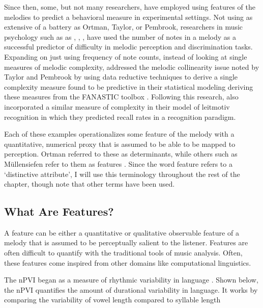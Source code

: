 \documentclass[12pt,]{book}
\begin{document}
Since then, some, but not many researchers, have employed using features of the melodies to predict a behavioral measure in experimental settings.
Not using as extensive of a battery as Ortman, Taylor, or Pembrook, researchers in music psychology such as as \citet{akiva-kabiriMemoryTonalPitches2009}, \citet{dewittRecognitionNovelMelodies1986}, \citet{eerolaExpectancySamiYoiks2009}, \citet{schulzeWorkingMemorySpeech2012} have used the number of notes in a melody as a successful predictor of difficulty in melodic perception and discrimination tasks.
Expanding on just using frequency of note counts, \citet{harrisonModellingMelodicDiscrimination2016} instead of looking at single measures of melodic complexity, addressed the melodic collinearity issue noted by Taylor and Pembrook by using data reductive techniques to derive a single complexity measure found to be predictive in their statistical modeling deriving these measures from the FANASTIC toolbox \citep{mullensiefenFantasticFeatureANalysis2009}.
Following this research, \citet{bakerPerceptionLeitmotivesRichard2017} also incorporated a similar measure of complexity in their model of leitmotiv recognition in which they predicted recall rates in a recognition paradigm.

Each of these examples operationalizes some feature of the melody with a quantitative, numerical proxy that is assumed to be able to be mapped to perception.
Ortman referred to these as determinants, while others such as Müllensiefen refer to them as features \citep{mullensiefenFantasticFeatureANalysis2009}.
Since the word feature refers to a `distinctive attribute', I will use this terminology throughout the rest of the chapter, though note that other terms have been used.

\hypertarget{what-are-features}{%
\subsection{What Are Features?}\label{what-are-features}}

A feature can be either a quantitative or qualitative observable feature of a melody that is assumed to be perceptually salient to the listener.
Features are often difficult to quantify with the traditional tools of music analysis.
Often, these features come inspired from other domains like computational linguistics.

The nPVI began as a measure of rhythmic variability in language \citep{grabeDurationalVariabilitySpeech2002}.
Shown below, the nPVI quantifies the amount of durational variability in language.
It works by comparing the variability of vowel length compared to syllable length
\end{document}
